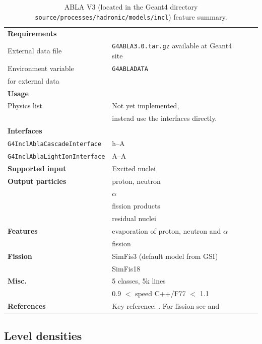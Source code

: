 \begin{table}[ht]
  \caption{{\sf ABLA V3} (located in the {\sf Geant4} directory
    {\tt source/\-processes/\-hadronic/\-models/\-incl}) feature summary.}
\label{tbl:ablasummary}
\vskip1cm
\begin{center}
\begin{tabular}{l | p{5 cm} l}
\hline
{\bf Requirements} & \\
External data file & {\tt G4ABLA3.0.tar.gz} available at Geant4 site~\cite{DataFiles} \\
Environment variable & {\tt G4ABLADATA} \\ 
for external data & \\
\hline
{\bf Usage}      & \\
Physics list     & Not yet implemented, \\
                 & instead use the interfaces directly. \\
\hline
{\bf Interfaces} &     \\
{\tt G4InclAblaCascadeInterface} &  h--A \\
{\tt G4InclAblaLightIonInterface} &  A--A \\
\hline
{\bf Supported input}     & Excited nuclei \\
\hline
{\bf Output particles}    & proton, neutron \\
                    & $\alpha$ \\
                    & fission products \\
                    & residual nuclei \\
\hline
{\bf Features} & evaporation of proton, neutron and $\alpha$ \\
                    & fission \\
\hline
{\bf Fission}  & {\sf SimFis3} (default model from GSI) \\
               & {\sf SimFis18} \\
\hline
{\bf Misc.}                & 5 classes, 5k lines \\
                    & 0.9 $<$ speed C++/F77 $<$ 1.1 \\
\hline
{\bf References}    & Key reference: \cite{Junghans98a}. For fission see \cite{Benlliure98a} and \cite{FissionModels} \\
\hline
\end{tabular}
\end{center}
\end{table}

\subsection{Level densities}

